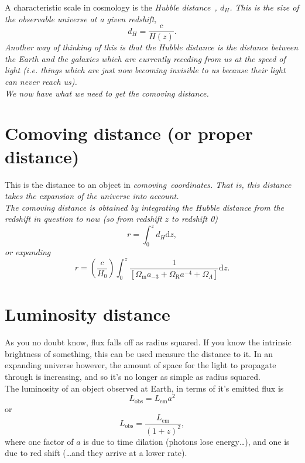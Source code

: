 \documentclass[]{article}
\begin{document}
\noindent A characteristic scale in cosmology is the \itshape Hubble distance~\upshape, $d_H$. This is the size of the observable universe at a given redshift,
\begin{equation}
d_H = \frac{c}{H(z)}.
\end{equation}
Another way of thinking of this is that the Hubble distance is the distance between the Earth and the galaxies which are currently receding from us at the speed of light (i.e. things which are just now becoming invisible to us because their light can never reach us). \\

\noindent We now have what we need to get the comoving distance.

\section{Comoving distance (or proper distance)}
This is the distance to an object in \itshape comoving~\upshape coordinates. That is, this distance takes the expansion of the universe into account. \\

\noindent The comoving distance is obtained by integrating the Hubble distance from the redshift in question to now (so from redshift $z$ to redshift 0)
\begin{equation}
r = \int_0^z d_H \mathrm{d}z,
\end{equation}
or expanding
\begin{equation}
r = \left(\frac{c}{H_0}\right)\int_0^z \frac{1}{[\Omega_\mathrm{m} a_{-3}+\Omega_\mathrm{R} a^{-4}+\Omega_\Lambda]}\mathrm{d}z.
\end{equation}
\section{Luminosity distance}

As you no doubt know, flux falls off as radius squared. If you know the intrinsic brightness of something, this can be used measure the distance to it. In an expanding universe however, the amount of space for the light to propagate through is increasing, and so it’s no longer as simple as radius squared. \\

\noindent The luminosity of an object observed at Earth, in terms of it’s emitted flux is 
\begin{equation}
L_\mathrm{obs} = L_\mathrm{em}a^2
\end{equation}
or
\begin{equation}
L_\mathrm{obs} = \frac{L_\mathrm{em}}{(1+z)^2},
\end{equation}
where one factor of $a$ is due to time dilation (photons lose energy…), and one is due to red shift (…and they arrive at a lower rate).\\
\end{document}

